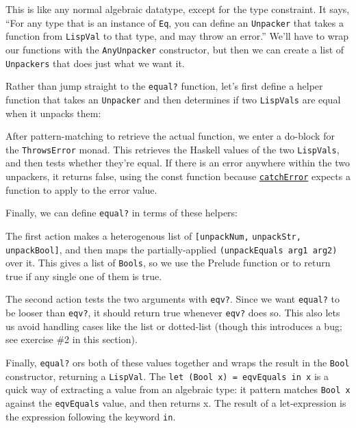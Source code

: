 This is like any normal algebraic datatype, except for the type constraint. It says, ``For any type that is an instance of \verb|Eq|, you can define an \verb|Unpacker| that takes a function from \verb|LispVal| to that type, and may throw an error.'' We'll have to wrap our functions with the \verb|AnyUnpacker| constructor, but then we can create a list of \verb|Unpackers| that does just what we want it.
 
Rather than jump straight to the \verb|equal?| function, let's first define a helper function that takes an \verb|Unpacker| and then determines if two \verb|LispVals| are equal when it unpacks them:
 
 
After pattern-matching to retrieve the actual function, we enter a do-block for the \verb|ThrowsError| monad. This retrieves the Haskell values of the two \verb|LispVals|, and then tests whether they're equal. If there is an error anywhere within the two unpackers, it returns false, using the const function because \href{http://www.haskell.org/ghc/docs/latest/html/libraries/mtl/Control-Monad-Error.html}{\texttt{catchError}} expects a function to apply to the error value.
 
Finally, we can define \verb|equal?| in terms of these helpers:
 
 
\sloppy
The first action makes a heterogenous list of \lstinline|[unpackNum,| \lstinline|unpackStr,| \lstinline|unpackBool]|, and then maps the partially-applied \lstinline|(unpackEquals arg1 arg2)| over it. This gives a list of \verb|Bools|, so we use the Prelude function or to return true if any single one of them is true.
\fussy
 
The second action tests the two arguments with \verb|eqv?|. Since we want \verb|equal?| to be looser than \verb|eqv?|, it should return true whenever \verb|eqv?| does so. This also lets us avoid handling cases like the list or dotted-list (though this introduces a bug; see exercise \#2 in this section).
 
Finally, \verb|equal?| ors both of these values together and wraps the result in the \verb|Bool| constructor, returning a \verb|LispVal|. The \lstinline|let (Bool x) = eqvEquals in x| is a quick way of extracting a value from an algebraic type: it pattern matches \verb|Bool x| against the \verb|eqvEquals| value, and then returns x. The result of a let-expression is the expression following the keyword \verb|in|.
 
